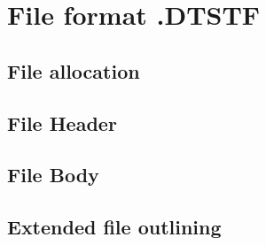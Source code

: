 \section{File format .DTSTF}
	\subsection{File allocation}
	\subsection{File Header}
	\subsection{File Body}
	\subsection{Extended file outlining}